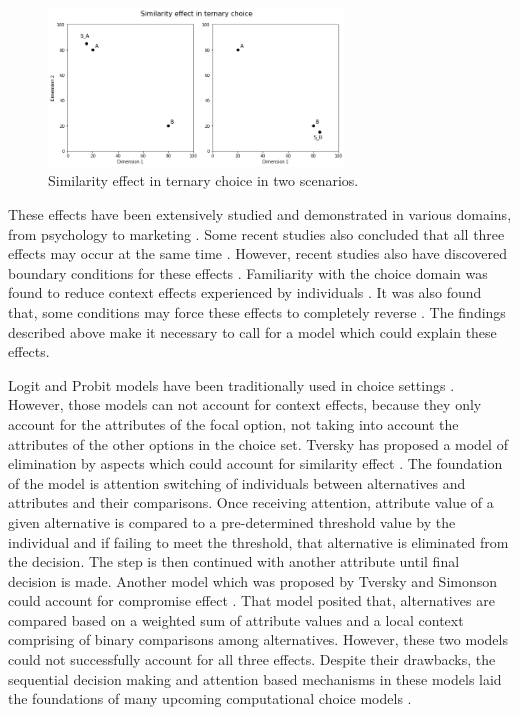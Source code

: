 \documentclass[a4paper,12pt]{article}
\newcommand{\citeyearonly}[1]{\citeyearpar{#1}}
\begin{document}
\begin{figure}[h]
    \centering
    \includegraphics[width=0.7\textwidth]{staticFiles/SimilarityEffect.png}
    \caption{Similarity effect in ternary choice in two scenarios.} %
    \label{fig:similarityEffect} %

\end{figure}

These effects have been extensively studied and demonstrated in various domains, from psychology to marketing \citep{herne1997decoy, soltani2012range, evangelidisEtAl18,  truebloodEtAl13, wuConsguner20, frederickEtAl14}. Some recent studies also concluded that all three effects may occur at the same time \citep{berkowitsch2014rigorously, noguchi2014attraction}. However, recent studies also have discovered boundary conditions for these effects \citep{liew2016appropriacy, spektor2018good, spektor2019similarity}. Familiarity with the choice domain was found to reduce context effects experienced by individuals \citep{kim2005attraction, sheng2005understanding}.  It was also found that, some conditions may force these effects to completely reverse \citep{cataldo2019comparison}. The findings described above make it necessary to call for a model which could explain these effects.

Logit and Probit models have been traditionally used in choice settings \citep{gensch1979multinomial, kim2017probit}. However, those models can not account for context effects, because they only account for the attributes of the focal option, not taking into account the attributes of the other options in the choice set. Tversky has proposed a model of elimination by aspects which could account for similarity effect \citeyearonly{tversky1972elimination}. The foundation of the model is attention switching of individuals between alternatives and attributes and their comparisons. Once receiving attention, attribute value of a given alternative is compared to a pre-determined threshold value by the individual and if failing to meet the threshold, that alternative is eliminated from the decision. The step is then  continued with another attribute until final decision is made. Another model which was proposed by Tversky and Simonson could account for compromise effect \citeyearonly{tverskySimonson93}. That model posited that, alternatives are compared based on a weighted sum of attribute values and a local context comprising of binary comparisons among alternatives. However, these two models could not successfully account for all three effects. Despite their drawbacks, the sequential decision making and attention based mechanisms in these models laid the foundations of many upcoming computational choice models \citep{bhatia2013associations}. 
\end{document}
